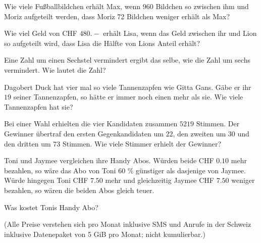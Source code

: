 \begin{bbwAufgabenBlock}
\item Wie viele Fußballbildchen erhält Max, wenn 960 Bildchen so
zwischen ihm und Moriz aufgeteilt werden, dass Moriz 72 Bildchen
weniger erhält als Max?



\item Wie viel Geld von CHF $480.-$ erhält Lisa, wenn das Geld
zwischen ihr und Lion so aufgeteilt wird, dass Lisa die Hälfte von
Lions Anteil erhält?


\item Eine Zahl um einen Sechstel vermindert ergibt das selbe, wie die
Zahl um sechs vermindert. Wie lautet die Zahl?


\item Dagobert Duck hat vier mal so viele Tannenzapfen wie Gitta
Gans. Gäbe er ihr $19$ seiner Tannenzapfen, so hätte er immer noch einen
mehr als sie. Wie viele Tannenzapfen hat sie?


\item Bei einer Wahl erhielten die vier Kandidaten zusammen $5219$
Stimmen. Der Gewinner übertraf den ersten Gegenkandidaten um $22$, den
zweiten um $30$ und den dritten um $73$ Stimmen. Wie viele Stimmer erhielt
der Gewinner?


\noTRAINER{\newpage}

\item Toni und Jaymee vergleichen ihre Handy Abos.
Würden beide CHF $0.10$ mehr bezahlen, so wäre das Abo von Toni 60 \% günstiger als dasjenige von Jaymee.
Würde hingegen Toni CHF $7.50$ mehr und gleichzeitig Jaymee CHF $7.50$ weniger bezahlen, so wären die beiden Abos gleich teuer.

Was kostet Tonis Handy Abo?


{\tiny{(Alle Preise verstehen sich pro Monat inklusive SMS und Anrufe in der Schweiz inklusive Datenepaket von 5 GiB pro Monat; nicht kumulierbar.)}}




\end{bbwAufgabenBlock}


\platzFuerBerechnungenBisEndeSeite{}%
%
